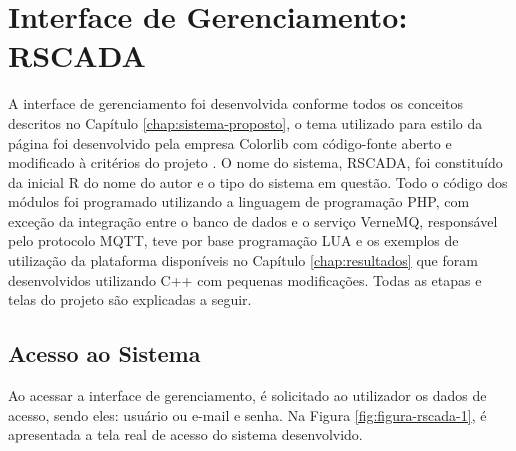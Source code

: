 \chapter{Interface de Gerenciamento: RSCADA}
\label{chap:interface-web}

A interface de gerenciamento foi desenvolvida conforme todos os conceitos descritos no Capítulo \ref{chap:sistema-proposto}, o tema utilizado para estilo da página foi desenvolvido pela empresa Colorlib com código-fonte aberto e modificado à critérios do projeto \cite{Concept}. O nome do sistema, RSCADA,  foi constituído da inicial R do nome do autor e o tipo do sistema em questão. Todo o código dos módulos foi programado utilizando a linguagem de programação PHP, com exceção da integração entre o banco de dados e o serviço VerneMQ, responsável pelo protocolo MQTT, teve por base programação LUA e os exemplos de utilização da plataforma disponíveis no Capítulo \ref{chap:resultados} que foram desenvolvidos utilizando C++ com pequenas modificações. Todas as etapas e telas do projeto são explicadas a seguir.

\section{Acesso ao Sistema}
\label{sec:acesso-sistema}
Ao acessar a interface de gerenciamento, é solicitado ao utilizador os dados de acesso, sendo eles: usuário ou e-mail e senha. Na Figura \ref{fig:figura-rscada-1}, é apresentada a tela real de acesso do sistema desenvolvido.

        \begin{figure}[!h]
    	\end{figure}

